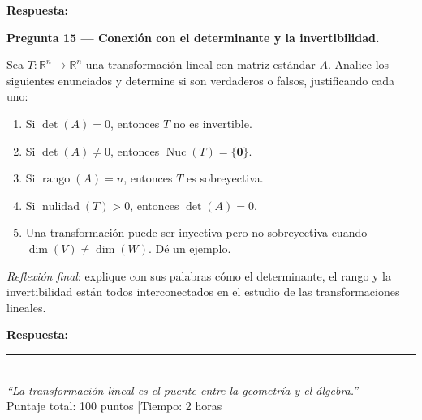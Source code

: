 \documentclass[12pt, letterpaper]{article}
\newcommand{\R}{\mathbb{R}}
\newcommand{\Ker}{\operatorname{Nuc}}   %
\newcommand{\rango}{\operatorname{rango}}
\newcommand{\nulidad}{\operatorname{nulidad}}
\begin{document}
\vspace{4pt}

\noindent\textbf{Respuesta:}
\vspace{7cm}

\newpage

\begin{cajapregunta}
\textbf{Pregunta 15 — Conexión con el determinante y la invertibilidad.}

Sea $T:\R^n\to\R^n$ una transformación lineal con matriz estándar $A$. Analice los siguientes enunciados y determine si son verdaderos o falsos, justificando cada uno:

\begin{enumerate}[label=\alph*)]
  \item Si $\det(A)=0$, entonces $T$ no es invertible.
  \item Si $\det(A)\neq 0$, entonces $\Ker(T)=\{\mathbf{0}\}$.
  \item Si $\rango(A)=n$, entonces $T$ es sobreyectiva.
  \item Si $\nulidad(T)>0$, entonces $\det(A)=0$.
  \item Una transformación puede ser inyectiva pero no sobreyectiva cuando $\dim(V)\neq\dim(W)$. Dé un ejemplo.
\end{enumerate}

\noindent\textit{Reflexión final}: explique con sus palabras cómo el determinante, el rango y la invertibilidad están todos interconectados en el estudio de las transformaciones lineales.
\end{cajapregunta}

\vspace{4pt}

\noindent\textbf{Respuesta:}
\vspace{10cm}

\vspace{1cm}
\begin{center}
\rule{\linewidth}{0.5pt}\\[4pt]
\small\textit{``La transformación lineal es el puente entre la geometría y el álgebra.''} \\[2pt]
\small Puntaje total: 100 puntos \quad|\quad Tiempo: 2 horas
\end{center}
\end{document}
